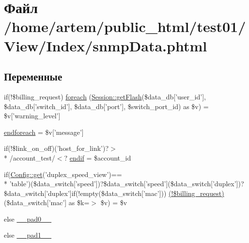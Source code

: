 \hypertarget{snmp_data_8phtml}{\section{Файл /home/artem/public\-\_\-html/test01/\-View/\-Index/snmp\-Data.phtml}
\label{snmp_data_8phtml}
}
\subsection*{Переменные}
\begin{DoxyCompactItemize}
\item 
if(!\$billing\-\_\-request) \hyperlink{snmp_data_8phtml_ad4128fad7b5af6f950a9b08c7a326c07}{foreach} (\hyperlink{class_session_ae4c4b98671bdd1fbfe4ae9defb5405ad}{Session\-::get\-Flash}(\$data\-\_\-db\mbox{[}'user\-\_\-id'\mbox{]}, \$data\-\_\-db\mbox{[}'switch\-\_\-id'\mbox{]}, \$data\-\_\-db\mbox{[}'port'\mbox{]}, \$switch\-\_\-port\-\_\-id) as \$v) = \$v\mbox{[}'warning\-\_\-level'\mbox{]}
\item 
\hyperlink{snmp_data_8phtml_a672d9707ef91db026c210f98cc601123}{endforeach} = \$v\mbox{[}'message'\mbox{]}
\item 
if(!\$link\-\_\-on\-\_\-off)('host\-\_\-for\-\_\-link')?$>$\\*
/account\-\_\-test/$<$? \hyperlink{snmp_data_8phtml_ad46029792e22c84c23775487f5df39df}{endif} = \$account\-\_\-id
\item 
if(\hyperlink{class_config_a15e2679f2a8f6fa4d60757f4d65413ac}{Config\-::get}('duplex\-\_\-speed\-\_\-view')== \\*
'table')(\$data\-\_\-switch\mbox{[}'speed'\mbox{]})?\$data\-\_\-switch\mbox{[}'speed'\mbox{]}(\$data\-\_\-switch\mbox{[}'duplex'\mbox{]})?\$data\-\_\-switch\mbox{[}'duplex'\mbox{]}if(!empty(\$data\-\_\-switch\mbox{[}'mac'\mbox{]})) \hyperlink{snmp_data_8phtml_acdc3d14aaf4fe531149c8ceaea738f59}{(!\$billing\-\_\-request)} (\$data\-\_\-switch\mbox{[}'mac'\mbox{]} as \$k=$>$ \$v) = \$v
\item 
else \hyperlink{snmp_data_8phtml_a8e01dcc96c43199448ee66f7c2ae8ea6}{\-\_\-\-\_\-pad0\-\_\-\-\_\-}
\item 
else \hyperlink{snmp_data_8phtml_ae8b4bb1441c6ab4dcb28a37bc46c8ead}{\-\_\-\-\_\-pad1\-\_\-\-\_\-}
\end{DoxyCompactItemize}


